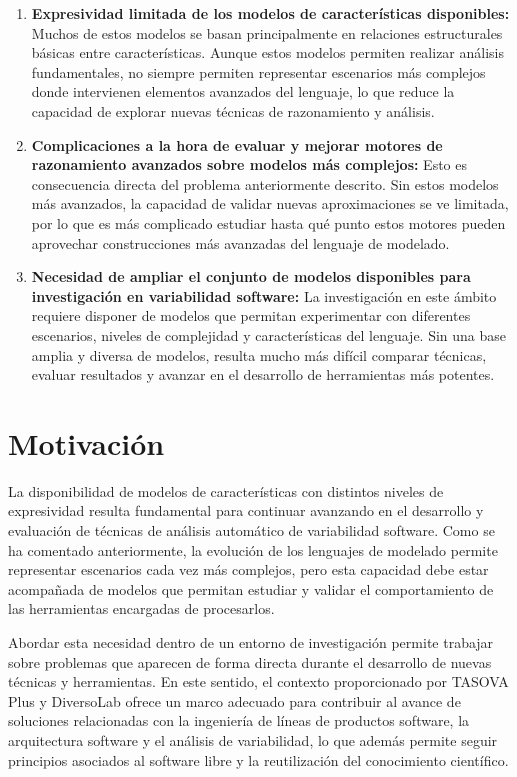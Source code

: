 \begin{enumerate}
  \item \textbf{Expresividad limitada de los modelos de características disponibles:} Muchos de estos modelos se basan principalmente en relaciones estructurales básicas entre características. Aunque estos modelos permiten realizar análisis fundamentales, no siempre permiten representar escenarios más complejos donde intervienen elementos avanzados del lenguaje, lo que reduce la capacidad de explorar nuevas técnicas de razonamiento y análisis.
  \item \textbf{Complicaciones a la hora de evaluar y mejorar motores de razonamiento avanzados sobre modelos más complejos:} Esto es consecuencia directa del problema anteriormente descrito. Sin estos modelos más avanzados, la capacidad de validar nuevas aproximaciones se ve limitada, por lo que es más complicado estudiar hasta qué punto estos motores pueden aprovechar construcciones más avanzadas del lenguaje de modelado.
  \item \textbf{Necesidad de ampliar el conjunto de modelos disponibles para investigación en variabilidad software:} La investigación en este ámbito requiere disponer de modelos que permitan experimentar con diferentes escenarios, niveles de complejidad y características del lenguaje. Sin una base amplia y diversa de modelos, resulta mucho más difícil comparar técnicas, evaluar resultados y avanzar en el desarrollo de herramientas más potentes.
\end{enumerate}

\section{Motivación}
\label{sec:motivacion}




La disponibilidad de modelos de características con distintos niveles de expresividad resulta fundamental para continuar avanzando en el desarrollo y evaluación de técnicas de análisis automático de variabilidad software. Como se ha comentado anteriormente, la evolución de los lenguajes de modelado permite representar escenarios cada vez más complejos, pero esta capacidad debe estar acompañada de modelos que permitan estudiar y validar el comportamiento de las herramientas encargadas de procesarlos.

Abordar esta necesidad dentro de un entorno de investigación permite trabajar sobre problemas que aparecen de forma directa durante el desarrollo de nuevas técnicas y herramientas. En este sentido, el contexto proporcionado por TASOVA Plus y DiversoLab ofrece un marco adecuado para contribuir al avance de soluciones relacionadas con la ingeniería de líneas de productos software, la arquitectura software y el análisis de variabilidad, lo que además permite seguir principios asociados al software libre y la reutilización del conocimiento científico.

